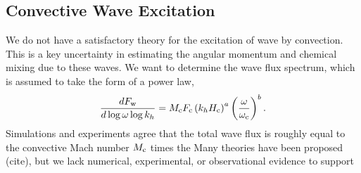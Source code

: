 {\color{purple}
\subsection{Convective Wave Excitation}
}

We do not have a satisfactory theory for the excitation of wave by convection. This is a key uncertainty in estimating the angular momentum and chemical mixing due to these waves. We want to determine the wave flux spectrum, which is assumed to take the form of a power law,
\begin{equation}
\frac{d F_{\rm w}}{d\log \omega \log k_h} = M_{\rm c}F_{\rm c} \left(k_h H_{\rm c}\right)^{a} \left(\frac{\omega}{\omega_{\rm c}}\right)^{b}.
\end{equation}
Simulations and experiments agree that the total wave flux is roughly equal to the convective Mach number $M_{\rm c}$ times the 
Many theories have been proposed (cite), but we lack numerical, experimental, or observational evidence to support  
